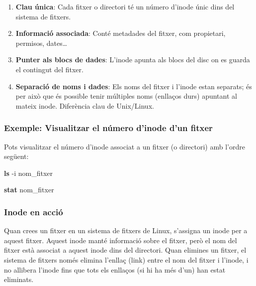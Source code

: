 \documentclass[
  12 pt,
  a4paper,
]{article}
\newenvironment{Shaded}{\begin{snugshade}}{\end{snugshade}}
\newcommand{\AttributeTok}[1]{\textcolor[rgb]{0.13,0.29,0.53}{#1}}
\newcommand{\FunctionTok}[1]{\textcolor[rgb]{0.13,0.29,0.53}{\textbf{#1}}}
\newcommand{\NormalTok}[1]{#1}
\providecommand{\tightlist}{%
  \setlength{\itemsep}{0pt}\setlength{\parskip}{0pt}}
\begin{document}
\begin{enumerate}
\def\labelenumi{\arabic{enumi}.}
\tightlist
\item
  \textbf{Clau única}: Cada fitxer o directori té un número d'inode únic
  dins del sistema de fitxers.
\item
  \textbf{Informació associada}: Conté metadades del fitxer, com
  propietari, permisos, dates\ldots{}
\item
  \textbf{Punter als blocs de dades}: L'inode apunta als blocs del disc
  on es guarda el contingut del fitxer.
\item
  \textbf{Separació de noms i dades}: Els noms del fitxer i l'inode
  estan separats; és per això que és possible tenir múltiples noms
  (enllaços durs) apuntant al mateix inode. Diferència clau de
  Unix/Linux.
\end{enumerate}

\subsubsection{Exemple: Visualitzar el número d'inode d'un
fitxer}\label{exemple-visualitzar-el-nuxfamero-dinode-dun-fitxer}

Pots visualitzar el número d'inode associat a un fitxer (o directori)
amb l'ordre següent:

\begin{Shaded}
\begin{Highlighting}[]
\FunctionTok{ls} \AttributeTok{{-}i}\NormalTok{ nom\_fitxer}
\end{Highlighting}
\end{Shaded}

\begin{Shaded}
\begin{Highlighting}[]
\FunctionTok{stat}\NormalTok{ nom\_fitxer}
\end{Highlighting}
\end{Shaded}

\subsubsection{Inode en acció}\label{inode-en-acciuxf3}

Quan crees un fitxer en un sistema de fitxers de Linux, s'assigna un
inode per a aquest fitxer. Aquest inode manté informació sobre el
fitxer, però el nom del fitxer està associat a aquest inode dins del
directori. Quan elimines un fitxer, el sistema de fitxers només elimina
l'enllaç (link) entre el nom del fitxer i l'inode, i no allibera l'inode
fins que tots els enllaços (si hi ha més d'un) han estat eliminats.
\end{document}
